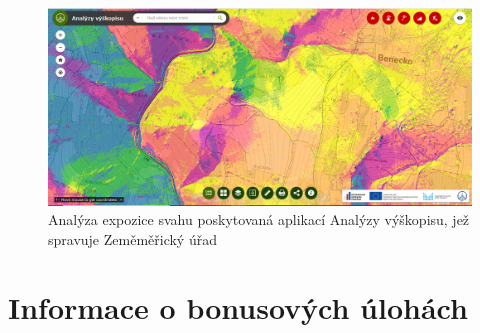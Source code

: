 \documentclass[a4paper,11pt,twoside]{article}
\begin{document}
\vspace{0.2cm}
\begin{figure}[hbt!] 
\begin{center}
\includegraphics[width=15cm]{pictures/analyzy_orientace.PNG} 
\caption[Analýza expozice svahu poskytovaná aplikací Analýzy výškopisu, jež spravuje Zeměměřický úřad]{Analýza expozice svahu poskytovaná aplikací Analýzy výškopisu, jež spravuje Zeměměřický úřad \cite{analyzyCUZK}}
\label{fig:jar}
\end{center}
\end{figure}

\section{Informace o bonusových úlohách}
\end{document}
